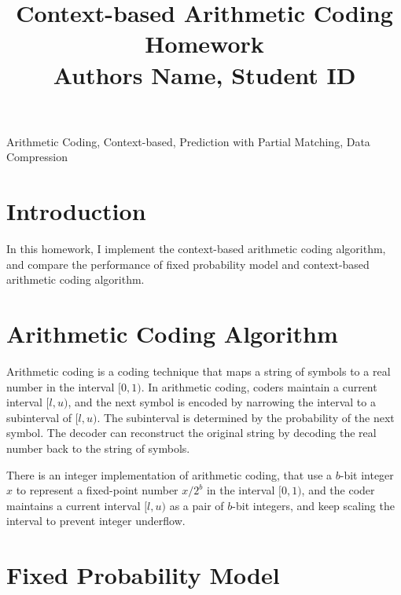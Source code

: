 \documentclass[a4paper,conference]{IEEEtran}
\begin{document}
\renewcommand\footnoterule{{\hrule height 0.5pt}\vspace{0.04in}}
\def\IEEEkeywordsname{Keywords}

\title{Context-based Arithmetic Coding Homework\\
\vspace{-0.1in}
{\normalsize Authors Name, Student ID}
}

\author{}

\maketitle

\vspace{0.1in}

\begin{IEEEkeywords}
Arithmetic Coding, Context-based, Prediction with Partial Matching, Data Compression
\end{IEEEkeywords}

\section{Introduction}

In this homework, I implement the context-based arithmetic coding algorithm, and compare the performance of fixed probability model and context-based arithmetic coding algorithm.

\section{Arithmetic Coding Algorithm}

Arithmetic coding is a coding technique that maps a string of symbols to a real number in the interval $[0, 1)$. In arithmetic coding, coders maintain a current interval $[l, u)$, and the next symbol is encoded by narrowing the interval to a subinterval of $[l, u)$. The subinterval is determined by the probability of the next symbol. The decoder can reconstruct the original string by decoding the real number back to the string of symbols.

There is an integer implementation of arithmetic coding, that use a $b$-bit integer $x$ to represent a fixed-point number $x / 2^b$ in the interval $[0, 1)$, and the coder maintains a current interval $[l, u)$ as a pair of $b$-bit integers, and keep scaling the interval to prevent integer underflow.

\section{Fixed Probability Model}
\end{document}
